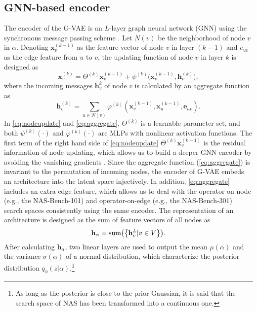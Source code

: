 \documentclass[10pt,twocolumn,letterpaper]{article}
\begin{document}
\subsection{GNN-based encoder} 
The encoder of the G-VAE is an $L$-layer graph neural network (GNN) using the synchronous message passing scheme \cite{fey2019fast}. Let $N(v)$ be the neighborhood of node $v$ in $\alpha$. Denoting $\mathbf{x}_{v}^{(k-1)}$ as the feature vector of node $v$ in layer $(k-1)$ and $e_{uv}$ as the edge feature from $u$ to $v$, the updating function of node $v$ in layer $k$ is designed as
\begin{equation}
	\label{eq:nodeupdate}
	\mathbf{x}_{v}^{(k)} = \Theta^{(k)}\mathbf{x}_{v}^{(k-1)} + {\psi}^{(k)} \big( \mathbf{x}_{v}^{(k-1)}, \mathbf{h}_{v}^{(k)} \big),
\end{equation}
where the incoming messages $\mathbf{h}_{v}^{k}$ of node $v$ is calculated by an aggregate function as
\begin{equation}
	\label{eq:aggregate}
	\mathbf{h}_{v}^{(k)} = \sum_{u\in N(v)} {\varphi}^{(k)}(\mathbf{x}_{v}^{(k-1)}, \mathbf{x}_{u}^{(k-1)}, \mathbf{e}_{uv}).
\end{equation}
In \eqref{eq:nodeupdate} and \eqref{eq:aggregate}, $\Theta^{(k)}$ is a learnable parameter set, and both ${\psi}^{(k)}(\cdot)$ and ${\varphi}^{(k)}(\cdot)$ are MLPs with nonlinear activation functions. The first term of the right hand side of \eqref{eq:nodeupdate} $\Theta^{(k)}\mathbf{x}_{v}^{(k-1)}$ is the residual information of node updating, which allows us to build a deeper GNN encoder by avoiding the vanishing gradients \cite{DBLP:conf/cvpr/HeZRS16}. Since the aggregate function (\ref{eq:aggregate}) is invariant to the permutation of incoming nodes, the encoder of G-VAE embeds an architecture into the latent space injectively. In addition, \eqref{eq:aggregate} includes an extra edge feature, which allows us to deal with the operator-on-node (e.g., the NAS-Bench-101) and operator-on-edge (e.g., the NAS-Bench-301) search spaces consistently using the same encoder. The representation of an architecture is designed as the sum of feature vectors of all nodes as 
\begin{equation}
	\textbf{h}_{\alpha} = {\rm sum}\big( \big\{  \mathbf{h}_{v}^{L} | v\in V   \big\} \big).
\end{equation}
After calculating $\mathbf{h}_{\alpha}$, two linear layers are used to output the mean $\mu(\alpha)$ and the variance $\sigma(\alpha)$ of a normal distribution, which characterize the posterior distribution $q_{\phi}(z|\alpha)$.\footnote{As long as the posterior is close to the prior Gaussian, it is said that the search space of NAS has been transformed into a continuous one.}
\end{document}
